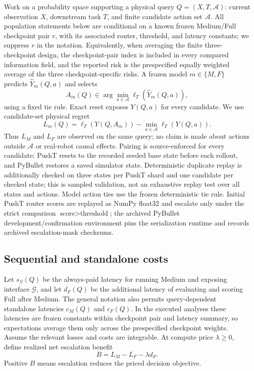 \documentclass[10pt]{article}
\theoremstyle{definition}
\theoremstyle{remark}
\newcommand{\G}{\mathcal{G}}
\begin{document}
Work on a probability space supporting a physical query
$Q=(X,T,\mathcal A)$: current observation $X$, downstream task $T$, and finite
candidate action set $\mathcal A$.  All population statements below are
conditional on a known frozen Medium/Full checkpoint pair $r$, with its
associated router, threshold, and latency constants; we suppress $r$ in the
notation.  Equivalently, when averaging the finite three-checkpoint design,
the checkpoint-pair index is included in every compared information field,
and the reported risk is the prespecified equally weighted average of the
three checkpoint-specific risks.  A frozen model $m\in\{M,F\}$ predicts
$\widehat Y_m(Q,a)$ and selects
\[
 A_m(Q)\in\arg\min_{a\in\mathcal A}
 \ell_T(\widehat Y_m(Q,a)),
\]
using a fixed tie rule.  Exact reset exposes $Y(Q,a)$ for every candidate.
We use candidate-set physical regret
\[
 L_m(Q)=\ell_T(Y(Q,A_m))
 -\min_{a\in\mathcal A}\ell_T(Y(Q,a)).
\]
Thus $L_M$ and $L_F$ are observed on the same query; no claim is made about
actions outside $\mathcal A$ or real-robot causal effects.  Pairing is
source-enforced for every candidate: PushT resets to the recorded seeded base
state before each rollout, and PyBullet restores a saved simulator state.
Deterministic duplicate replay is additionally checked on three states per
PushT shard and one candidate per checked state; this is sampled validation,
not an exhaustive replay test over all states and actions.  Model action ties
use the frozen deterministic tie rule.  Initial PushT router scores are replayed as
NumPy float32 and escalate only under the strict comparison
$\text{score}>\text{threshold}$; the archived PyBullet development/confirmation environment pins the
serialization runtime and records archived escalation-mask checksums.

\subsection{Sequential and standalone costs}

Let $s_{\G}(Q)$ be the always-paid latency for running Medium and exposing
interface $\G$, and let $d_F(Q)$ be the additional latency of evaluating and
scoring Full after Medium.  The general notation also permits query-dependent
standalone latencies $c_M(Q)$ and $c_F(Q)$.  In the executed analyses these
latencies are frozen constants within checkpoint pair and latency summary, so
expectations average them only across the prespecified checkpoint weights.
Assume the relevant losses and costs are integrable.  At compute price $\lambda\geq0$, define realized net escalation
benefit
\begin{equation}
  B=L_M-L_F-\lambda d_F .
  \label{eq:benefit}
\end{equation}
Positive $B$ means escalation reduces the priced decision objective.
\end{document}
